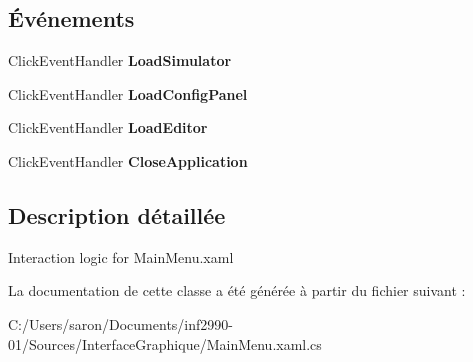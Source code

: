 \subsection*{Événements}
\begin{DoxyCompactItemize}
\item 
\hypertarget{class_interface_graphique_1_1_main_menu_ac1e4e9ec2b21248485a980c14a53fa08}{Click\-Event\-Handler {\bfseries Load\-Simulator}}\label{class_interface_graphique_1_1_main_menu_ac1e4e9ec2b21248485a980c14a53fa08}

\item 
\hypertarget{class_interface_graphique_1_1_main_menu_ae8457f768a93f8724ab3d591633cbffc}{Click\-Event\-Handler {\bfseries Load\-Config\-Panel}}\label{class_interface_graphique_1_1_main_menu_ae8457f768a93f8724ab3d591633cbffc}

\item 
\hypertarget{class_interface_graphique_1_1_main_menu_a1fcf5c5928a6c12352f6c3878de70a6e}{Click\-Event\-Handler {\bfseries Load\-Editor}}\label{class_interface_graphique_1_1_main_menu_a1fcf5c5928a6c12352f6c3878de70a6e}

\item 
\hypertarget{class_interface_graphique_1_1_main_menu_a31b655a84417d9e2ad7bb768c56215a2}{Click\-Event\-Handler {\bfseries Close\-Application}}\label{class_interface_graphique_1_1_main_menu_a31b655a84417d9e2ad7bb768c56215a2}

\end{DoxyCompactItemize}


\subsection{Description détaillée}
Interaction logic for Main\-Menu.\-xaml 



La documentation de cette classe a été générée à partir du fichier suivant \-:\begin{DoxyCompactItemize}
\item 
C\-:/\-Users/saron/\-Documents/inf2990-\/01/\-Sources/\-Interface\-Graphique/Main\-Menu.\-xaml.\-cs\end{DoxyCompactItemize}
